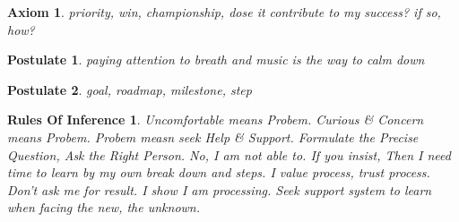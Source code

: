 \documentclass{article}
\newtheorem{axiom}{Axiom}
\newtheorem{postulate}{Postulate}
\newtheorem{rules of inference}{Rules Of Inference}
\begin{document}
\begin{axiom}
    priority,
    win, championship,
    dose it contribute to my success? if so, how?
\end{axiom}

\begin{postulate}
    paying attention to breath and music is the way to calm down
\end{postulate}

\begin{postulate}
    goal,
    roadmap,
    milestone,
    step
\end{postulate}

\begin{rules of inference}
    Uncomfortable means Probem.
    Curious & Concern means Probem.
    Probem measn seek Help & Support.
    Formulate the Precise Question, Ask the Right Person.
    No, I am not able to. If you insist,
    Then I need time to learn by my own break down and steps.
    I value process, trust process.
    Don't ask me for result. I show I am  processing.
    Seek support system to learn when facing the new, the unknown.
\end{rules of inference}
\end{document}
